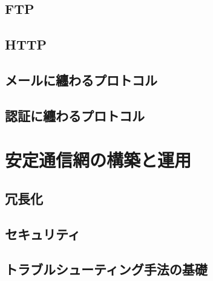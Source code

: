 \documentclass[a4j,12pt]{jreport}
\makeatletter
\newcommand{\beginappendix}{
  \setcounter{chapter}{0}
  \renewcommand{\prechaptername}{付録}
  \renewcommand{\postchaptername}{} 
  \renewcommand{\thechapter}{\@Alph\c@chapter}
  \renewcommand{\thesection}{\@Alph\c@chapter.\@arabic\c@section}
  \renewcommand{\thesubsection}{\@Alph\c@chapter.\@arabic\c@section.\@arabic\c@subsection}
}
\makeatother
\begin{document}
\chapter{FTP}

\chapter{HTTP}

\chapter{メールに纏わるプロトコル} %

\chapter{認証に纏わるプロトコル} %


\part{安定通信網の構築と運用}

\chapter{冗長化}

\chapter{セキュリティ}

\chapter{トラブルシューティング手法の基礎}


%

%

%

%

%

\printindex
\end{document}
